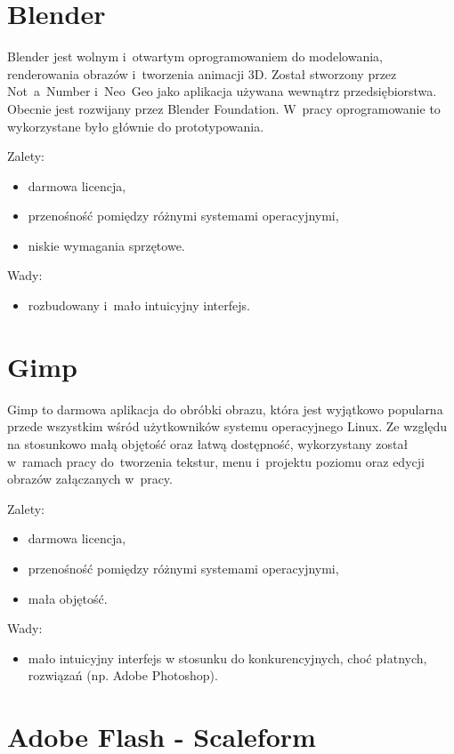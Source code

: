 \section{Blender}
Blender jest wolnym i~otwartym oprogramowaniem do modelowania, renderowania obrazów i~tworzenia animacji 3D. Został stworzony przez Not~a~Number i~Neo~Geo jako aplikacja używana wewnątrz przedsiębiorstwa. Obecnie jest rozwijany przez Blender Foundation. W~pracy oprogramowanie to wykorzystane było głównie do prototypowania.

{\raggedright
Zalety:
\begin{itemize}
\item darmowa licencja,
\item przenośność pomiędzy różnymi systemami operacyjnymi,
\item niskie wymagania sprzętowe.
\end{itemize}

Wady:
\begin{itemize}
\item rozbudowany i~mało intuicyjny interfejs.
\end{itemize}
}

\section{Gimp}

Gimp to darmowa aplikacja do obróbki obrazu, która jest wyjątkowo popularna przede wszystkim wśród użytkowników systemu operacyjnego Linux. Ze względu na stosunkowo małą objętość oraz łatwą dostępność, wykorzystany został w~ramach pracy do~tworzenia tekstur, menu i~projektu poziomu oraz edycji obrazów załączanych w~pracy.

{\raggedright
Zalety:
\begin{itemize}
\item darmowa licencja,
\item przenośność pomiędzy różnymi systemami operacyjnymi,
\item mała objętość.
\end{itemize}

Wady:
\begin{itemize}
\item mało intuicyjny interfejs w stosunku do konkurencyjnych, choć płatnych, rozwiązań (np. Adobe Photoshop).
\end{itemize}
}

\section{Adobe Flash - Scaleform}

